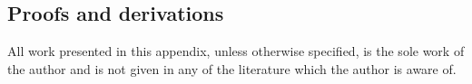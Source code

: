 \documentclass{report}
\begin{document}


\begin{appendix}
\chapter{Proofs and derivations}
All work presented in this appendix, unless otherwise specified, is the sole work
of the author and is not given in any of the literature which the author is aware of.


\end{appendix}

\end{document}
